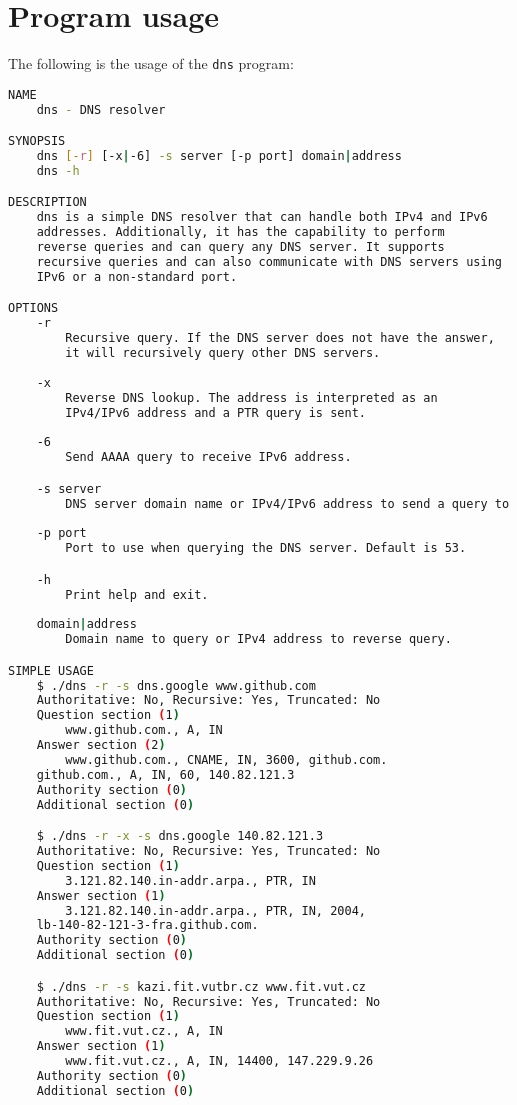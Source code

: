\documentclass[a4paper, 11pt]{article}
\begin{document}
\section{Program usage}

    The following is the usage of the \texttt{dns} program:
    \begin{lstlisting}[language=bash]
NAME
    dns - DNS resolver

SYNOPSIS
    dns [-r] [-x|-6] -s server [-p port] domain|address
    dns -h

DESCRIPTION
    dns is a simple DNS resolver that can handle both IPv4 and IPv6 
    addresses. Additionally, it has the capability to perform 
    reverse queries and can query any DNS server. It supports 
    recursive queries and can also communicate with DNS servers using 
    IPv6 or a non-standard port. 

OPTIONS
    -r
        Recursive query. If the DNS server does not have the answer, 
        it will recursively query other DNS servers.
    
    -x
        Reverse DNS lookup. The address is interpreted as an 
        IPv4/IPv6 address and a PTR query is sent.
    
    -6
        Send AAAA query to receive IPv6 address.

    -s server
        DNS server domain name or IPv4/IPv6 address to send a query to.
    
    -p port
        Port to use when querying the DNS server. Default is 53.

    -h
        Print help and exit.
    
    domain|address
        Domain name to query or IPv4 address to reverse query.

SIMPLE USAGE
    $ ./dns -r -s dns.google www.github.com
    Authoritative: No, Recursive: Yes, Truncated: No    
    Question section (1)
        www.github.com., A, IN
    Answer section (2)
        www.github.com., CNAME, IN, 3600, github.com.
    github.com., A, IN, 60, 140.82.121.3
    Authority section (0)
    Additional section (0)

    $ ./dns -r -x -s dns.google 140.82.121.3
    Authoritative: No, Recursive: Yes, Truncated: No    
    Question section (1)
        3.121.82.140.in-addr.arpa., PTR, IN
    Answer section (1)
        3.121.82.140.in-addr.arpa., PTR, IN, 2004, 
    lb-140-82-121-3-fra.github.com.
    Authority section (0)
    Additional section (0)  

    $ ./dns -r -s kazi.fit.vutbr.cz www.fit.vut.cz
    Authoritative: No, Recursive: Yes, Truncated: No
    Question section (1)
        www.fit.vut.cz., A, IN
    Answer section (1)
        www.fit.vut.cz., A, IN, 14400, 147.229.9.26
    Authority section (0)
    Additional section (0)


\end{lstlisting}
\end{document}
